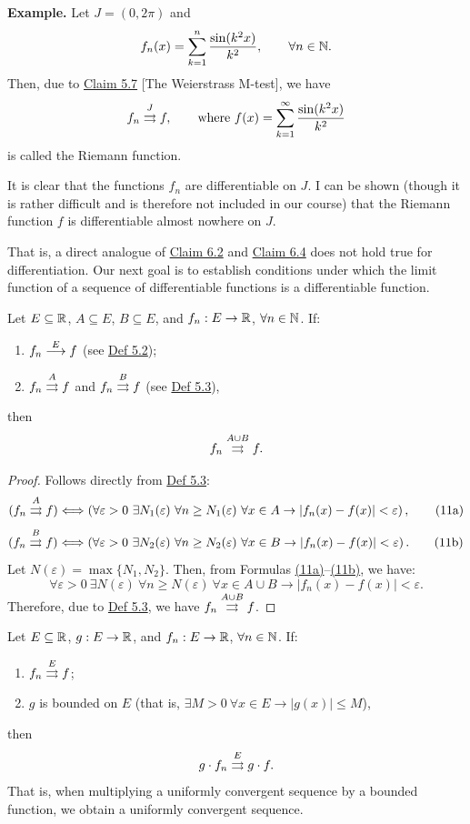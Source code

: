 \textbf{Example.}
Let $J=(0,2\pi)$ and
\[
f_n(x)=\sum_{k=1}^{n}\frac{\sin(k^2x)}{k^2},\qquad \forall n\in\mathbb{N}.
\]
Then, due to \hyperref[claim:5.7]{Claim 5.7} [The Weierstrass M-test], we have
\[
f_n\mathrel{\overset{J}{\rightrightarrows}}f,
\qquad
\text{where }f(x)=\sum_{k=1}^{\infty}\frac{\sin(k^2x)}{k^2}
\]
is called the Riemann function.

It is clear that the functions $f_n$ are differentiable on $J$.
I can be shown (though it is rather difficult and is therefore not included in our course) that the Riemann function $f$ is differentiable almost nowhere on $J$.

That is, a direct analogue of \hyperref[claim:6.2]{Claim 6.2} and \hyperref[claim:6.4]{Claim 6.4} does not hold true for differentiation.
Our next goal is to establish conditions under which the limit function of a sequence of differentiable functions is a differentiable function.

\begin{claim}\label{claim:6.6}
Let $E\subseteq\mathbb{R}$, $A\subseteq E$, $B\subseteq E$, and $f_n:E\to\mathbb{R}$, $\forall n\in\mathbb{N}$.
If:
\begin{enumerate}[label=\alph*)]
    \item\label{item:claim:6.6:a} $f_n\mathrel{\overset{E}{\longrightarrow}}f$ \quad (see \hyperref[def:5.2]{Def 5.2});
    \item\label{item:claim:6.6:b} $f_n\mathrel{\overset{A}{\rightrightarrows}}f$ and $f_n\mathrel{\overset{B}{\rightrightarrows}}f$ \quad (see \hyperref[def:5.3]{Def 5.3}),
\end{enumerate}
then
\[
f_n\mathrel{\overset{A\cup B}{\rightrightarrows}}f.
\]
\end{claim}

\begin{proof}
Follows directly from \hyperref[def:5.3]{Def 5.3}:
\[
(f_n\mathrel{\overset{A}{\rightrightarrows}}f)
\Longleftrightarrow
\left(\forall\varepsilon>0\ \exists N_1(\varepsilon)\ \forall n\geq N_1(\varepsilon)\ \forall x\in A
\to |f_n(x)-f(x)|<\varepsilon\right),
\tag{11a}\label{eq:6:11a:1}
\]
\[
(f_n\mathrel{\overset{B}{\rightrightarrows}}f)
\Longleftrightarrow
\left(\forall\varepsilon>0\ \exists N_2(\varepsilon)\ \forall n\geq N_2(\varepsilon)\ \forall x\in B
\to |f_n(x)-f(x)|<\varepsilon\right).
\tag{11b}\label{eq:6:11b:1}
\]
Let $N(\varepsilon)=\max\{N_1,N_2\}$. Then, from Formulas \hyperref[eq:6:11a:1]{(11a)}--\hyperref[eq:6:11b:1]{(11b)}, we have:
\[
\forall\varepsilon>0\ \exists N(\varepsilon)\ \forall n\geq N(\varepsilon)\ \forall x\in A\cup B
\to |f_n(x)-f(x)|<\varepsilon.
\]
Therefore, due to \hyperref[def:5.3]{Def 5.3}, we have $f_n\mathrel{\overset{A\cup B}{\rightrightarrows}}f$.
\end{proof}

\begin{claim}\label{claim:6.7}
Let $E\subseteq\mathbb{R}$, $g:E\to\mathbb{R}$, and $f_n:E\to\mathbb{R}$, $\forall n\in\mathbb{N}$.
If:
\begin{enumerate}[label=\alph*)]
    \item\label{item:claim:6.7:a} $f_n\mathrel{\overset{E}{\rightrightarrows}}f$;
    \item\label{item:claim:6.7:b} $g$ is bounded on $E$ (that is, $\exists M>0\ \forall x\in E\to |g(x)|\leq M$),
\end{enumerate}
then
\[
g\cdot f_n\mathrel{\overset{E}{\rightrightarrows}}g\cdot f.
\]
That is, when multiplying a uniformly convergent sequence by a bounded function, we obtain a uniformly convergent sequence.
\end{claim}

